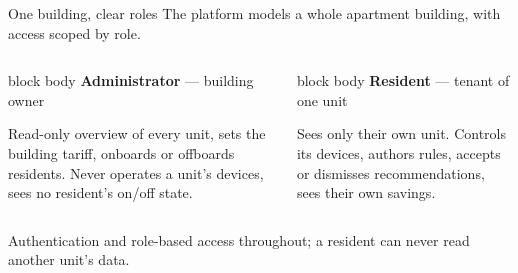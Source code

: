 \documentclass[aspectratio=169,11pt]{beamer}
\begin{document}
\begin{frame}{One building, clear roles}
  \vspace{0.3em}
  The platform models a whole apartment building, with access scoped by role.
  \vspace{0.8em}
  \begin{columns}[T]
    \begin{beamercolorbox}[wd=\textwidth,sep=9pt,rounded=true]{block body}
      {\color{accent}\bfseries Administrator} — building owner\par\vspace{3pt}
      \small Read-only overview of every unit, sets the building tariff, onboards or
      offboards residents. Never operates a unit's devices, sees no resident's
      on/off state.
    \end{beamercolorbox}
    \begin{beamercolorbox}[wd=\textwidth,sep=9pt,rounded=true]{block body}
      {\color{accent}\bfseries Resident} — tenant of one unit\par\vspace{3pt}
      \small Sees only their own unit. Controls its devices, authors rules, accepts or
      dismisses recommendations, sees their own savings.
    \end{beamercolorbox}
  \end{columns}
  \vspace{0.9em}
  \begin{center}\small\color{mut}
  Authentication and role-based access throughout; a resident can never read another
  unit's data.
  \end{center}
\end{frame}
\end{document}
